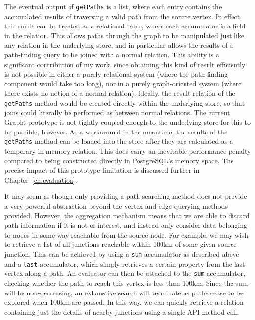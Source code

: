 The eventual output of \texttt{getPaths} is a list, where each entry contains
the accumulated results of traversing a valid path from the source vertex. In
effect, this result can be treated as a relational table, where each
accumulator is a field in the relation. This allows paths through the graph to
be manipulated just like any relation in the underlying store, and in
particular allows the results of a path-finding query to be joined with a
normal relation. This ability is a significant contribution of my work, since
obtaining this kind of result efficiently is not possible in either a purely
relational system (where  the path-finding component would take too long), nor
in a purely graph-oriented  system (where there exists no notion of a normal
relation).  %
Ideally, the result relation of the \texttt{getPaths} method would be created
directly within the underlying store, so that joins could literally be
performed as between normal relations. The current Grapht prototype is not
tightly coupled enough to the underlying store for this to be possible,
however. As a workaround in the meantime, the results of the \texttt{getPaths}
method can be loaded into the store after they are calculated as a temporary
in-memory relation. This does carry an inevitable performance  penalty
compared to being constructed directly in PostgreSQL's memory space. The
precise impact of this prototype limitation is discussed further in
Chapter~\ref{ch:evaluation}.


It may seem as though only providing a path-searching method does not provide
a  very powerful abstraction beyond the vertex and edge-querying methods
provided.  However, the aggregation mechanism means that we are able to
discard path information if it is not of interest, and instead only consider
data belonging to nodes in some  way reachable from the source node. For
example,  we may wish to retrieve a list of all junctions reachable within
100km of some given source junction. This can be achieved by using a
\texttt{sum} accumulator as described above and a \texttt{last} accumulator,
which simply retrieves  a certain property from the last vertex along a path.
An evaluator can then be attached to the \texttt{sum} accumulator, checking
whether the path to reach this vertex is less than 100km. Since the sum will
be non-decreasing,  an exhaustive search will terminate as paths cease to be
explored when 100km are passed. In this way, we can quickly retrieve a relation
containing just the details of nearby junctions using a single API method call.






